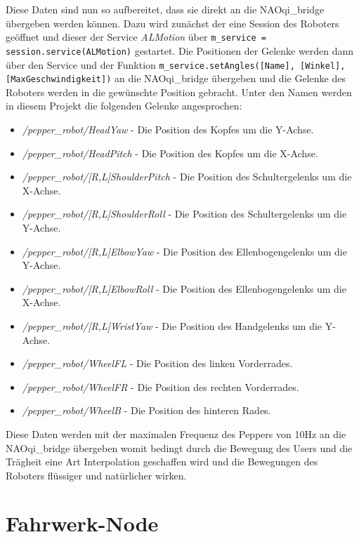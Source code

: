 \noindent
Diese Daten sind nun so aufbereitet, dass sie direkt an die NAOqi\_bridge übergeben werden können. Dazu wird zunächst der eine Session des Roboters geöffnet und dieser der Service \textit{ALMotion} über \texttt{m\_service = session.service(ALMotion)} gestartet. Die Positionen der Gelenke werden dann über den Service und der Funktion \texttt{m\_service.setAngles([Name], [Winkel], [MaxGeschwindigkeit])} an die NAOqi\_bridge übergeben und die Gelenke des Roboters werden in die gewünschte Position gebracht. Unter den Namen werden in diesem Projekt die folgenden Gelenke angesprochen:
\begin{itemize}
    \item \textit{/pepper\_robot/HeadYaw} - Die Position des Kopfes um die Y-Achse.
    \item \textit{/pepper\_robot/HeadPitch} - Die Position des Kopfes um die X-Achse.
    \item \textit{/pepper\_robot/[R,L]ShoulderPitch} - Die Position des Schultergelenks um die X-Achse.
    \item \textit{/pepper\_robot/[R,L]ShoulderRoll} - Die Position des Schultergelenks um die Y-Achse.
    \item \textit{/pepper\_robot/[R,L]ElbowYaw} - Die Position des Ellenbogengelenks um die Y-Achse.
    \item \textit{/pepper\_robot/[R,L]ElbowRoll} - Die Position des Ellenbogengelenks um die X-Achse.
    \item \textit{/pepper\_robot/[R,L]WristYaw} - Die Position des Handgelenks um die Y-Achse.
    \item \textit{/pepper\_robot/WheelFL} - Die Position des linken Vorderrades.
    \item \textit{/pepper\_robot/WheelFR} - Die Position des rechten Vorderrades.
    \item \textit{/pepper\_robot/WheelB} - Die Position des hinteren Rades.
\end{itemize}

Diese Daten werden mit der maximalen Frequenz des Peppers von 10Hz an die NAOqi\_bridge übergeben womit bedingt durch die Bewegung des Users und die Trägheit eine Art Interpolation geschaffen wird und die Bewegungen des Roboters flüssiger und natürlicher wirken.\\

\section{Fahrwerk-Node}\label{sec:Fahrwerk-Node}

